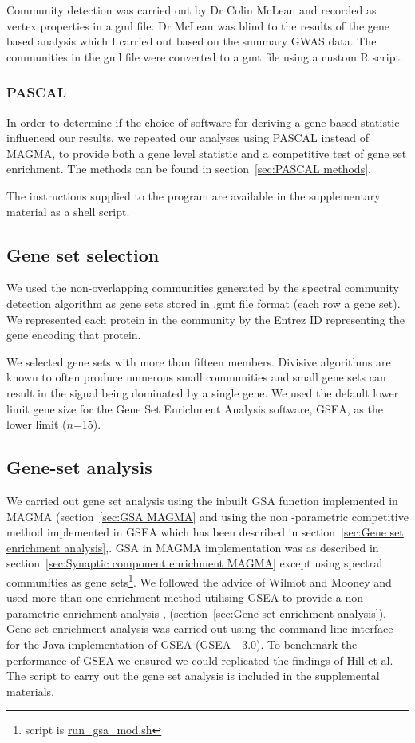 Community detection was carried out by Dr Colin McLean and recorded as vertex properties in a gml file. Dr McLean was blind to the results of the gene based analysis which I carried out based on the summary GWAS data. The communities in the gml file were converted to a gmt file using a custom R script. 



\subsubsection{PASCAL}
\label{sec:PASCAL community detection}
In order to determine if the choice of software for deriving a gene-based statistic influenced our results, we repeated our analyses using PASCAL instead of MAGMA, to provide both a gene level statistic and a competitive test of gene set enrichment\cite{lamparter2016fast}. The methods can be found in section~\ref{sec:PASCAL methods}.

 The instructions supplied to the program are available in the supplementary material as a shell script. 

\subsection{Gene set selection}
We used the non-overlapping communities generated by the spectral community detection algorithm as gene sets stored in .gmt file format (each row a gene set). We represented each protein in the community by the Entrez ID representing the gene encoding that protein. 

We selected gene sets with more than fifteen members. Divisive algorithms are known to often produce numerous small communities and small gene sets can result in the signal being dominated by a single gene. We used the default lower limit gene size for the Gene Set Enrichment Analysis software, GSEA, as the lower limit ($n$=15). 

\subsection{Gene-set analysis}
\label{sec:Gene set analysis community detection}
We carried out gene set analysis using the inbuilt GSA function implemented in MAGMA (section~\ref{sec:GSA MAGMA} and using the non -parametric competitive method implemented in GSEA which has been described in section~\ref{sec:Gene set enrichment analysis}\cite{de2015magma},\cite{subramanian2005gene}.  GSA in MAGMA implementation was as described in section~\ref{sec:Synaptic component enrichment MAGMA} except using spectral communities as gene sets\footnote{script is \url{run_gsa_mod.sh}}.   We followed the advice of Wilmot and Mooney and used more than one enrichment method utilising GSEA to provide a non- parametric enrichment analysis \cite{subramanian2005gene},\cite{mooney2015gene} (section~\ref{sec:Gene set enrichment analysis}).  Gene set enrichment analysis was carried out using the command line interface for the Java implementation of GSEA (GSEA - 3.0). To benchmark the performance of GSEA we ensured we could replicated the findings of Hill et al\cite{hill2014functional}.  The script to carry out the gene set analysis is included in the supplemental materials. 

